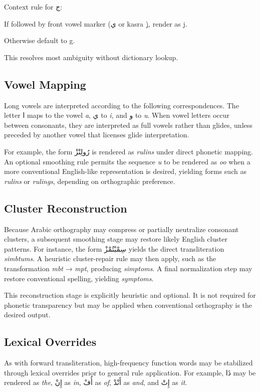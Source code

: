 \documentclass[12pt]{article}
\newcommand{\AR}[1]{\foreignlanguage{arabic}{#1}}
\begin{document}
Context rule for \AR{ج}:

If followed by front vowel marker (\AR{ي} or kasra \AR{ِ}), render as j.

Otherwise default to g.

This resolves most ambiguity without dictionary lookup.

\subsection{Vowel Mapping}

Long vowels are interpreted according to the following correspondences. The letter \AR{ا} maps to the vowel \textit{a}, \AR{ي} to \textit{i}, and \AR{و} to \textit{u}. When vowel letters occur between consonants, they are interpreted as full vowels rather than glides, unless preceded by another vowel that licenses glide interpretation.

For example, the form \AR{رُولِنْزْ} is rendered as \textit{rulins} under direct phonetic mapping. An optional smoothing rule permits the sequence \textit{u} to be rendered as \textit{oo} when a more conventional English-like representation is desired, yielding forms such as \textit{rulins} or \textit{rulings}, depending on orthographic preference.

\subsection{Cluster Reconstruction}

Because Arabic orthography may compress or partially neutralize consonant clusters, a subsequent smoothing stage may restore likely English cluster patterns. For instance, the form \AR{سِمْبْتُمْزْ} yields the direct transliteration \textit{simbtums}. A heuristic cluster-repair rule may then apply, such as the transformation \textit{mbt} → \textit{mpt}, producing \textit{simptoms}. A final normalization step may restore conventional spelling, yielding \textit{symptoms}. 

This reconstruction stage is explicitly heuristic and optional. It is not required for phonetic transparency but may be applied when conventional orthography is the desired output.

\subsection{Lexical Overrides}

As with forward transliteration, high-frequency function words may be stabilized through lexical overrides prior to general rule application. For example, \AR{ذَا} may be rendered as \textit{the}, \AR{إِنْ} as \textit{in}, \AR{أُفْ} as \textit{of}, \AR{أَنْدْ} as \textit{and}, and \AR{إِتْ} as \textit{it}. 
\end{document}

